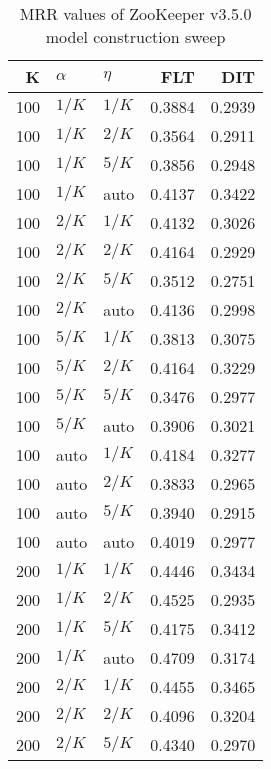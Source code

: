 
\begin{table}
\begin{spacing}{1.2}
\centering
\caption{MRR values of ZooKeeper v3.5.0 model construction sweep}
\label{table:zookeeper_model_sweep}
\vspace{0.2em}
\parbox{.45\linewidth}{\centering \begin{tabular}{rll|rr}
\toprule
   K &  $\alpha$ &    $\eta$ & FLT & DIT \\
\midrule
 100 &  $1/K$ &  $1/K$ &           0.3884 & 0.2939 \\
 100 &  $1/K$ &  $2/K$ &           0.3564 & 0.2911 \\
 100 &  $1/K$ &  $5/K$ &           0.3856 & 0.2948 \\
 100 &  $1/K$ &   auto &           0.4137 & 0.3422 \\
 100 &  $2/K$ &  $1/K$ &           0.4132 & 0.3026 \\
 100 &  $2/K$ &  $2/K$ &           0.4164 & 0.2929 \\
 100 &  $2/K$ &  $5/K$ &           0.3512 & 0.2751 \\
 100 &  $2/K$ &   auto &           0.4136 & 0.2998 \\
 100 &  $5/K$ &  $1/K$ &           0.3813 & 0.3075 \\
 100 &  $5/K$ &  $2/K$ &           0.4164 & 0.3229 \\
 100 &  $5/K$ &  $5/K$ &           0.3476 & 0.2977 \\
 100 &  $5/K$ &   auto &           0.3906 & 0.3021 \\
 100 &   auto &  $1/K$ &           0.4184 & 0.3277 \\
 100 &   auto &  $2/K$ &           0.3833 & 0.2965 \\
 100 &   auto &  $5/K$ &           0.3940 & 0.2915 \\
 100 &   auto &   auto &           0.4019 & 0.2977 \\
 200 &  $1/K$ &  $1/K$ &           0.4446 & 0.3434 \\
 200 &  $1/K$ &  $2/K$ &           0.4525 & 0.2935 \\
 200 &  $1/K$ &  $5/K$ &           0.4175 & 0.3412 \\
 200 &  $1/K$ &   auto &           0.4709 & 0.3174 \\
 200 &  $2/K$ &  $1/K$ &           0.4455 & 0.3465 \\
 200 &  $2/K$ &  $2/K$ &           0.4096 & 0.3204 \\
 200 &  $2/K$ &  $5/K$ &           0.4340 & 0.2970 \\

\end{tabular}}
\end{spacing}
\end{table}
